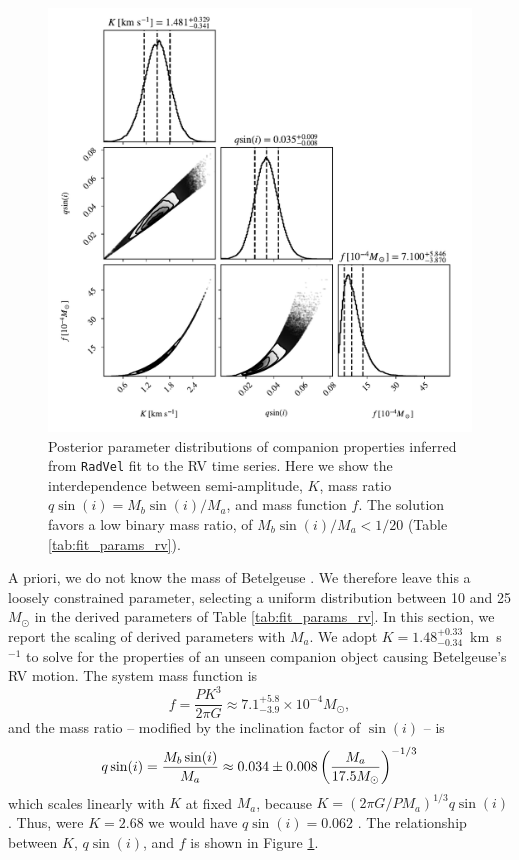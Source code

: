 \documentclass[twocolumn]{aastex631}
\begin{document}
\begin{figure}
    \centering
    \includegraphics[width=\linewidth]{figures/corner_mcmc_synth_Kqf.pdf}
    \caption{Posterior parameter distributions of companion properties inferred from {\tt RadVel} fit to the RV time series. Here we show the interdependence between semi-amplitude, $K$, mass ratio $q\sin(i) = M_b \sin(i)/M_a$, and mass function $f$. The solution favors a low binary mass ratio, of $M_b \sin(i)/M_a < 1/20$ (Table  \ref{tab:fit_params_rv}).  }
    \label{fig:Kqf}
\end{figure}










A priori, we do not know the mass of Betelgeuse \citep[e.g.][]{2020ApJ...902...63J}. We therefore leave this a loosely constrained parameter, selecting a uniform distribution between 10 and 25 $M_\odot$ in the derived parameters of Table \ref{tab:fit_params_rv}. In this section, we report the scaling of derived parameters with $M_a$.  We adopt $K=1.48^{+0.33}_{-0.34}$~km~s$^{-1}$ to solve for the properties of an unseen companion object causing Betelgeuse's RV motion. The system mass function is 
\begin{equation}
    f = \frac{ P K^3} {2 \pi G} \approx 7.1^{+5.8}_{-3.9}\times 10^{-4}  M_\odot ,
\end{equation}
and the mass ratio -- modified by the inclination factor of $\sin(i)$ -- is 
\begin{equation}
    q \sin (i) = \frac{M_b \sin(i)}{ M_a}  
    \approx 0.034 \pm 0.008  \left(M_a \over 17.5 M_\odot\right)^{-1/3}
\end{equation}
which scales linearly with $K$ at fixed $M_a$, because $K=(2\pi G / P M_a)^{1/3} q\sin(i)$. Thus, were $K= 2.68$ \citep[e.g. as determined based on the STELLA data by][]{2022csss.confE.185G} we would have $q \sin (i) = 0.062$ \citep{2024arXiv240809089G}. The relationship between $K$, $q\sin(i)$, and $f$ is shown in Figure \ref{fig:Kqf}. 
\end{document}
